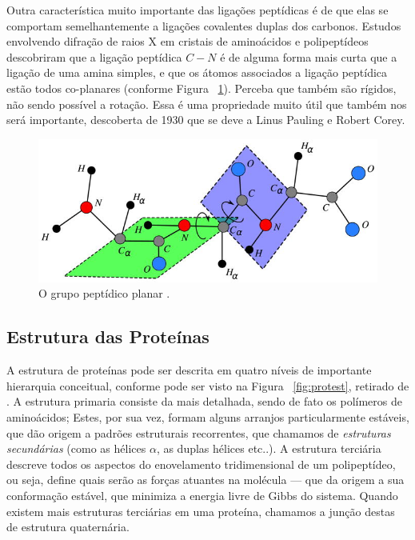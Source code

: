 \documentclass[a4paper,12pt]{article}
\begin{document}
	Outra característica muito importante das ligações peptídicas é de que elas se comportam semelhantemente a ligações covalentes duplas dos carbonos. Estudos envolvendo difração de raios X em cristais de aminoácidos e polipeptídeos descobriram que a ligação peptídica $C-N$ é de alguma forma mais curta que a ligação de uma amina simples, e que os átomos associados a ligação peptídica estão todos co-planares (conforme Figura ~\ref{fig:peptidica}). Perceba que também são rígidos, não sendo possível a rotação. Essa é uma propriedade muito útil que também nos será importante, descoberta de 1930 que se deve a Linus Pauling e Robert Corey.
	
	\begin{figure}[H]
		\begin{center}
			\includegraphics[width=0.8\linewidth]{peptide.jpg}
		\end{center}
		\caption{O grupo peptídico planar \cite{carlile:MinimalOrder}.}
		\label{fig:peptidica}
	\end{figure}

	\subsection{Estrutura das Proteínas}
	A estrutura de proteínas pode ser descrita em quatro níveis de importante hierarquia conceitual, conforme pode ser visto na Figura ~\ref{fig:protest}, retirado de \cite{bioquimicaLehninger}. A estrutura primaria consiste da mais detalhada, sendo de fato os polímeros de aminoácidos; Estes, por sua vez, formam alguns arranjos particularmente estáveis, que dão origem a padrões estruturais recorrentes, que chamamos de \textit{estruturas secundárias} (como as hélices $\alpha$, as duplas hélices etc..). A estrutura terciária descreve todos os aspectos do enovelamento tridimensional de um polipeptídeo, ou seja, define quais serão as forças atuantes na molécula --- que da origem a sua conformação estável, que minimiza a energia livre de Gibbs do sistema. Quando existem mais estruturas terciárias em uma proteína, chamamos a junção destas de estrutura quaternária.	
	
\end{document}
